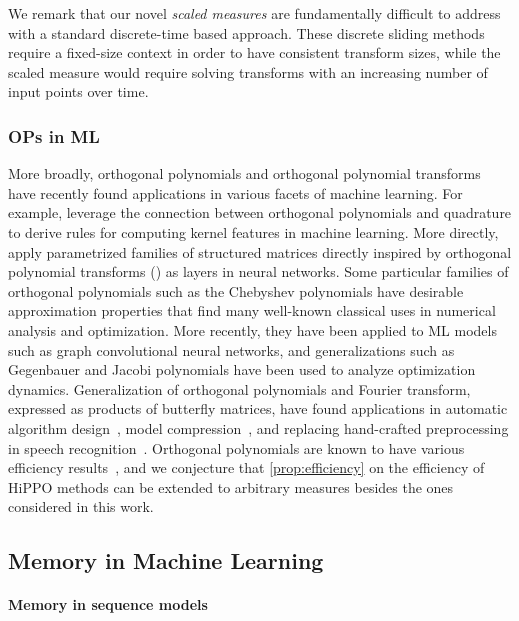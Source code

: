 \documentclass[../hippo.tex]{subfiles}
\begin{document}
\begin{description}
    We remark that our novel \emph{scaled measures} are fundamentally difficult to address with a standard discrete-time based approach.
    These discrete sliding methods require a fixed-size context in order to have consistent transform sizes,
    while the scaled measure would require solving transforms with an increasing number of input points over time.

\end{description}


\subsubsection{OPs in ML}
More broadly, orthogonal polynomials and orthogonal polynomial transforms have recently found applications in various facets of machine learning.
For example, \citet{dao2017gaussian} leverage the connection between orthogonal polynomials and quadrature to derive rules for computing kernel features in machine learning.
More directly, \cite{thomas2018learning} apply parametrized families of structured matrices directly inspired by orthogonal polynomial transforms (\citep{de2018two}) as layers in neural networks.
Some particular families of orthogonal polynomials such as the Chebyshev polynomials have desirable approximation properties that find many well-known classical uses in numerical analysis and optimization.
More recently, they have been applied to ML models such as graph convolutional neural networks\citep{defferrard2016convolutional}, and generalizations such as Gegenbauer and Jacobi polynomials have been used to analyze optimization dynamics\cite{yang2019mean,berthier2020accelerated}.
Generalization of orthogonal polynomials and Fourier transform, expressed as
products of butterfly matrices, have found applications in automatic algorithm
design~\citep{dao2019learning}, model compression~\citep{alizadeh2019butterfly},
and replacing hand-crafted preprocessing in speech
recognition~\citep{dao2020kaleidoscope}.
Orthogonal polynomials are known to have various efficiency results~\citep{de2018two}, and we conjecture that \cref{prop:efficiency} on the efficiency of HiPPO methods can be extended to arbitrary measures besides the ones considered in this work.



\subsection{Memory in Machine Learning}

\paragraph{Memory in sequence models}
\end{document}
